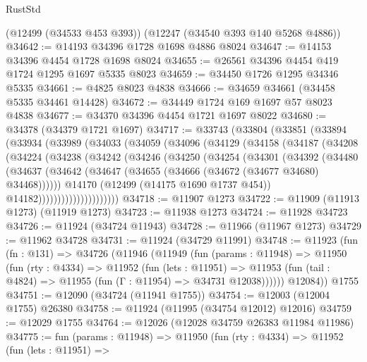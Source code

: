 \begin{lexlean}{RustStd}
\begin{coremodule}
{\begin{coremodule}
{{{{{{{{{{{{{{{{{{{{{{{{{{{{{{{{{{{{{{{{{{{{{{{{{{{{{{{{{{{{{{{{{{{{{{{{{{{{{{{{    (@12499 (@34533 @453 @393))
    (@12247 (@34540 @393 @140 @5268 @4886))
@34642 := @14193 @34396 @1728 @1698 @4886 @8024
@34647 := @14153 @34396 @4454 @1728 @1698 @8024
@34655 := @26561 @34396 @4454 @419 @1724 @1295 @1697 @5335 @8023
@34659 := @34450 @1726 @1295 @34346 @5335
@34661 := @4825 @8023 @4838
@34666 := @34659 @34661 (@34458 @5335 @34461 @14428)
@34672 := @34449 @1724 @169 @1697 @57 @8023 @4838
@34677 := @34370 @34396 @4454 @1721 @1697 @8022
@34680 := @34378 (@34379 @1721 @1697)
@34717 := @33743
    (@33804
      (@33851
        (@33894
          (@33934
            (@33989
              (@34033
                (@34059
                  (@34096
                    (@34129
                      (@34158
                        (@34187
                          (@34208
                            (@34224
                              (@34238
                                (@34242
                                  (@34246
                                    (@34250
                                      (@34254
                                        (@34301
                                          (@34392
                                            (@34480
                                              (@34637
                                                (@34642
                                                  (@34647
                                                    (@34655
                                                      (@34666 (@34672 (@34677 @34680) @34468))))))
                                              @14170
                                              (@12499 (@14175 @1690 @1737 @454))
                                              @14182)))))))))))))))))))))
@34718 := @11907 @1273
@34722 := @11909 (@11913 @1273) (@11919 @1273)
@34723 := @11938 @1273
@34724 := @11928 @34723
@34726 := @11924 (@34724 @11943)
@34728 := @11966 (@11967 @1273)
@34729 := @11962 @34728
@34731 := @11924 (@34729 @11991)
@34748 := @11923
    (fun (fn : @131) =>
    @34726
      (@11946
        (@11949
          (fun (params : @11948) =>
          @11950
            (fun (rty : @4334) =>
            @11952
              (fun (lets : @11951) =>
              @11953 (fun (tail : @4824) => @11955 (fun (Γ : @11954) => @34731 @12038))))))
        @12084))
    @1755
@34751 := @12090 (@34724 (@11941 @1755))
@34754 := @12003 (@12004 @1755) @26380
@34758 := @11924 (@11995 (@34754 @12012) @12016)
@34759 := @12029 @1755
@34764 := @12026 (@12028 @34759 @26383 @11984 @11986)
@34775 := fun (params : @11948) =>
  @11950
    (fun (rty : @4334) =>
    @11952
      (fun (lets : @11951) =>
}}}}}}}}}}}}}}}}}}}}}}}}}}}}}}}}}}}}}}}}}}}}}}}}}}}}}}}}}}}}}}}}}}}}}}}}}}}}}}}}
\end{coremodule}}
\end{coremodule}
\end{lexlean}
